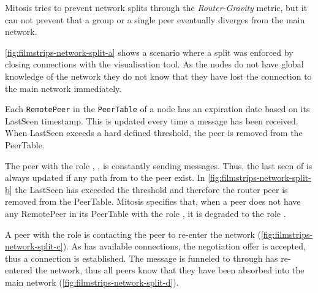 Mitosis tries to prevent network splits through the \textit{Router-Gravity} metric, but it can not prevent that a group or a single peer eventually diverges from the main network. 

\vref{fig:filmstrips-network-split-a} shows a scenario where a split was enforced by closing connections with the visualisation tool. As the nodes do not have global knowledge of the network they do not know that they have lost the connection to the main network immediately.

Each \lstinline|RemotePeer| in the \lstinline|PeerTable| of a node has an expiration date based on its LastSeen timestamp. This is updated every time a message has been received. When LastSeen exceeds a hard defined threshold, the peer is removed from the PeerTable.

The peer with the role \router, \alice, is constantly sending \routerAlive messages. Thus, the last seen of \alice is always updated if any path from \alice to the peer exist. 
In \vref{fig:filmstrips-network-split-b} the LastSeen has exceeded the threshold and therefore the router peer \alice is removed from the PeerTable. Mitosis specifies that, when a peer does not have any RemotePeer in its PeerTable with the role \router, it is degraded to the role \newbie.

A peer with the role \peer is contacting the \signal peer to re-enter the network (\vref{fig:filmstrips-network-split-c}). As \alice has available connections, the negotiation offer is accepted, thus a connection is established. The \routerAlive message is funneled to through has re-entered the network, thus all peers know that they have been absorbed into the main network (\vref{fig:filmstrips-network-split-d}).